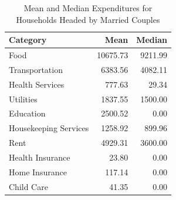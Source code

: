 \begin{table}[htbp]
\centering
\caption{Mean and Median Expenditures for Households Headed by Married Couples} 
\label{tab:married_expenditures}
\begin{tabular}{lrr}
  \hline
Category & Mean & Median \\ 
  \hline
Food & 10675.73 & 9211.99 \\ 
  Transportation & 6383.56 & 4082.11 \\ 
  Health Services & 777.63 & 29.34 \\ 
  Utilities & 1837.55 & 1500.00 \\ 
  Education & 2500.52 & 0.00 \\ 
  Housekeeping Services & 1258.92 & 899.96 \\ 
  Rent & 4929.31 & 3600.00 \\ 
  Health Insurance & 23.80 & 0.00 \\ 
  Home Insurance & 117.14 & 0.00 \\ 
  Child Care & 41.35 & 0.00 \\ 
   \hline
\end{tabular}
\end{table}
